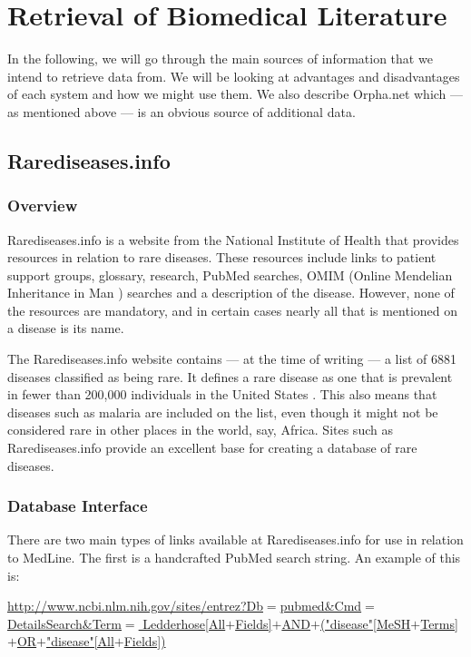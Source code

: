 \section{Retrieval of Biomedical Literature}

In the following, we will go through the main sources of information
that we intend to retrieve data from. We will be looking at advantages
and disadvantages of each system and how we might use them. We also
describe Orpha.net which --- as mentioned above --- is an obvious source of
additional data.

\subsection{Rarediseases.info\label{Rarediseases_info}}

\subsubsection{Overview}
Rarediseases.info is a website from the National Institute of Health
\cite{NIHOverview} that provides resources in relation to rare
diseases. These resources include links to patient support groups,
glossary, research, PubMed searches, OMIM (Online Mendelian
Inheritance in Man \cite{OMIM}) searches and a description of the
disease. However, none of the resources are mandatory, and in
certain cases nearly all that is mentioned on a disease is its name.

The Rarediseases.info website contains --- at the time of writing ---
a list of 6881 diseases classified as being rare. It defines a rare
disease as one that is prevalent in fewer than 200,000 individuals in
the United States \cite{RareDiseaseDef}. This also means that diseases
such as malaria are included on the list, even though it might not be
considered rare in other places in the world, say, Africa. Sites such
as Rarediseases.info provide an excellent base for creating a database
of rare diseases.

\subsubsection{Database Interface}
There are two main types of links available at Rarediseases.info for
use in relation to MedLine. The first is a handcrafted PubMed search
string. An example of this is:

\noindent
{\small
\href{http://www.ncbi.nlm.nih.gov/sites/entrez?Db=pubmed&Cmd=DetailsSearch&Term=Ledderhose[All+Fields]+AND+("disease"[MeSH+Terms]+OR+"disease"[All+Fields])}{http://www.ncbi.nlm.nih.gov/sites/entrez?Db$=$pubmed\&Cmd$=$DetailsSearch\&Term$=$ Ledderhose[All$+$Fields]$+$AND$+$("disease"[MeSH$+$Terms]$+$OR$+$"disease"[All$+$Fields])} \\
}


